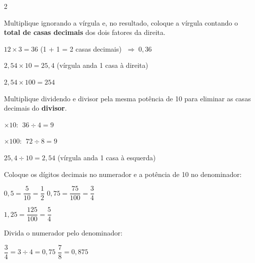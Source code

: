 \documentclass[12pt]{article}
\begin{document}
\begin{multicols}{2}



Multiplique ignorando a vírgula e, no resultado, coloque a vírgula
contando o \textbf{total de casas decimais} dos dois fatores da direita.


$12 \times 3 = 36$ \quad (1 + 1 = 2 casas decimais) $\;\Rightarrow\; \boxed{0{,}36}$


$2{,}54 \times 10 = 25{,}4$ \quad (vírgula anda 1 casa à direita)

$2{,}54 \times 100 = 254$


Multiplique dividendo e divisor pela mesma potência de 10 para
eliminar as casas decimais do \textbf{divisor}.


$\times 10$: $\;36 \div 4 = \boxed{9}$


$\times 100$: $\;72 \div 8 = \boxed{9}$


$25{,}4 \div 10 = 2{,}54$ \quad (vírgula anda 1 casa à esquerda)



Coloque os dígitos decimais no numerador e a potência de 10 no denominador:

$0{,}5 = \dfrac{5}{10} = \dfrac{1}{2}$ \qquad $0{,}75 = \dfrac{75}{100} = \dfrac{3}{4}$

$1{,}25 = \dfrac{125}{100} = \dfrac{5}{4}$


Divida o numerador pelo denominador:

$\dfrac{3}{4} = 3 \div 4 = 0{,}75$ \qquad $\dfrac{7}{8} = 0{,}875$


\end{multicols}

\end{document}
